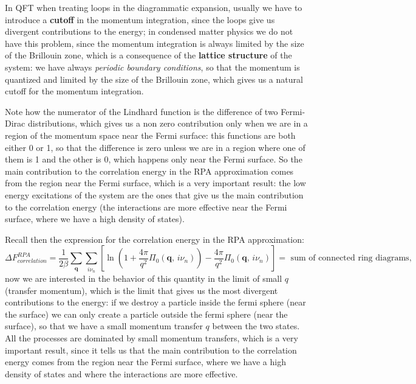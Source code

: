 In QFT when treating loops in the diagrammatic expansion, usually we have to introduce a \textbf{cutoff} in the momentum integration, since the loops give us divergent contributions to the energy; in condensed matter physics we do not have this problem, since the momentum integration is always limited by the size of the Brillouin zone, which is a consequence of the \textbf{lattice structure} of the system: we have always \textit{periodic boundary conditions}, so that the momentum is quantized and limited by the size of the Brillouin zone, which gives us a natural cutoff for the momentum integration.

Note how the numerator of the Lindhard function is the difference of two Fermi-Dirac distributions, which gives us a non zero contribution only when we are in a region of the momentum space near the Fermi surface: this functions are both either 0 or 1, so that the difference is zero unless we are in a region where one of them is 1 and the other is 0, which happens only near the Fermi surface. So the main contribution to the correlation energy in the RPA approximation comes from the region near the Fermi surface, which is a very important result: the low energy excitations of the system are the ones that give us the main contribution to the correlation energy (the interactions are more effective near the Fermi surface, where we have a high density of states).

Recall then the expression for the correlation energy in the RPA approximation:
\[
    \Delta F^{RPA}_{correlation} = \frac{1}{2\beta} \sum_{\mathbf{q}} \sum_{i \nu_n} \left[ \ln (1 + \frac{4\pi}{q^2} \Pi_0(\mathbf{q},\, i \nu_n)) - \frac{4\pi}{q^2} \Pi_0(\mathbf{q},\, i \nu_n) \right] = \text{ sum of connected ring diagrams},
\]
now we are interested in the behavior of this quantity in the limit of small \(q\) (transfer momentum), which is the limit that gives us the most divergent contributions to the energy: if we destroy a particle inside the fermi sphere (near the surface) we can only create a particle outside the fermi sphere (near the surface), so that we have a small momentum transfer \(q\) between the two states. All the processes are dominated by small momentum transfers, which is a very important result, since it tells us that the main contribution to the correlation energy comes from the region near the Fermi surface, where we have a high density of states and where the interactions are more effective.

